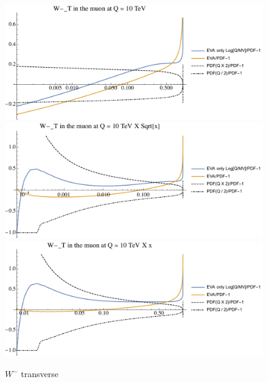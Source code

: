\documentclass[a4paper,11pt]{article}
\begin{document}
\begin{figure}[!b]
\includegraphics[width=0.46\linewidth]{Notebooks/PlotPDFs/ratios/10TeV/W-_T_Q.pdf}
\includegraphics[width=0.46\linewidth]{Notebooks/PlotPDFs/ratios/10TeV/W-_T_Qsqrtx.pdf}
\includegraphics[width=0.46\linewidth]{Notebooks/PlotPDFs/ratios/10TeV/W-_T_Qx.pdf}
\caption{$W^-$ transverse}
\end{figure}

\clearpage




%
\end{document}
